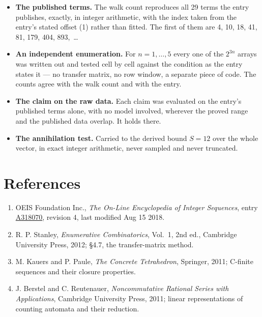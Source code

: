 \documentclass[11pt]{article}
\theoremstyle{definition}
\begin{document}
\begin{itemize}

\item {\bfseries The published terms.} The walk count reproduces all 29 terms the entry publishes, exactly, in integer arithmetic, with the index taken from the entry's stated offset (1) rather than fitted. The first of them are 4, 10, 18, 41, 81, 179, 404, 893,~\dots

\item {\bfseries An independent enumeration.} For $n = 1,\dots,5$ every one of the $2^{3n}$ arrays was written out and tested cell by cell against the condition as the entry states it --- no transfer matrix, no row window, a separate piece of code. The counts agree with the walk count and with the entry.

\item {\bfseries The claim on the raw data.} Each claim was evaluated on the entry's published terms alone, with no model involved, wherever the proved range and the published data overlap. It holds there.

\item {\bfseries The annihilation test.} Carried to the derived bound $S = 12$ over the whole vector, in exact integer arithmetic, never sampled and never truncated.

\end{itemize}

\section{References}

\begin{enumerate}

\item OEIS Foundation Inc., \emph{The On-Line Encyclopedia of Integer Sequences}, entry \href{https://oeis.org/A318070}{A318070}, revision 4, last modified Aug 15 2018.

\item R. P. Stanley, \emph{Enumerative Combinatorics}, Vol.~1, 2nd ed., Cambridge University Press, 2012; \S4.7, the transfer-matrix method.

\item M. Kauers and P. Paule, \emph{The Concrete Tetrahedron}, Springer, 2011; C-finite sequences and their closure properties.

\item J. Berstel and C. Reutenauer, \emph{Noncommutative Rational Series with Applications}, Cambridge University Press, 2011; linear representations of counting automata and their reduction.

\end{enumerate}
\end{document}
